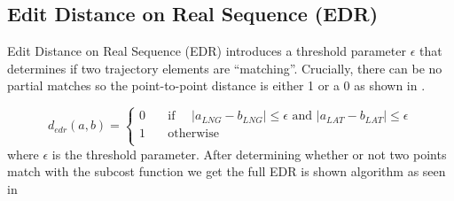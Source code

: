 


\subsection{Edit Distance on Real Sequence (EDR)}

Edit Distance on Real Sequence (EDR)\cite{12-RobustFast} introduces a threshold parameter $\epsilon$ that determines if two trajectory elements are “matching”. 
Crucially, there can be no partial matches so the point-to-point distance is either 1 or a 0 as shown in .

\begin{equation}\label{eq:edr_subcost}
d_{edr} (a, b) = \begin{cases}
0 \quad &\text{if } \quad | a_{LNG} -b_{LNG}|\leqslant  \epsilon  \text{ and } | a_{LAT} -b_{LAT}|\leqslant  \epsilon    \\
1 \quad &\text{otherwise}\\
\end{cases}
\end{equation}
where $\epsilon$ is the threshold parameter. After determining whether or not two points match with the subcost function we get the full EDR is shown  algorithm as seen in 



